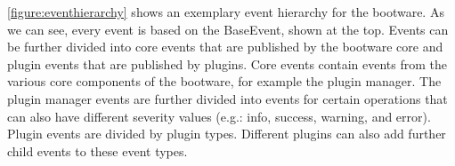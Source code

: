 \autoref{figure:eventhierarchy} shows an exemplary event hierarchy for the bootware.
As we can see, every event is based on the BaseEvent, shown at the top.
Events can be further divided into core events that are published by the bootware core and plugin events that are published by plugins.
Core events contain events from the various core components of the bootware, for example the plugin manager.
The plugin manager events are further divided into events for certain operations that can also have different severity values (e.g.: info, success, warning, and error).
Plugin events are divided by plugin types.
Different plugins can also add further child events to these event types.
